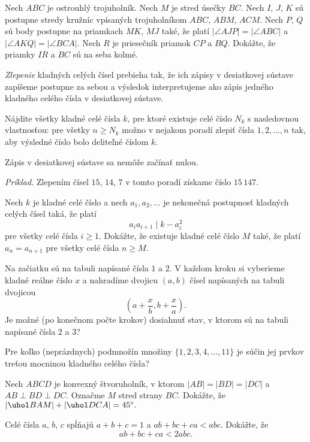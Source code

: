 {%
Nech $ABC$ je ostrouhlý trojuholník.
Nech $M$ je stred úsečky $BC$.
Nech $I$, $J$, $K$ sú postupne stredy kružníc vpísaných trojuholníkom $ABC$, $ABM$, $ACM$.
Nech $P$, $Q$ sú body postupne na priamkach $MK$, $MJ$ také, že platí $|\angle AJP| = |\angle ABC|$ a $|\angle AKQ| = |\angle BCA|$.
Nech $R$ je priesečník priamok $CP$ a $BQ$.
Dokážte, že priamky $IR$ a $BC$ sú na seba kolmé.}

{%
{\it Zlepenie} kladných celých čísel prebieha tak, že ich zápisy v desiatkovej sústave zapíšeme postupne za sebou a výsledok interpretujeme ako zápis jedného kladného celého čísla v desiatkovej sústave.

Nájdite všetky kladné celé čísla $k$, pre ktoré existuje celé číslo $N_k$ s nasledovnou vlastnosťou: pre všetky $n \ge N_k$ možno v nejakom poradí zlepiť čísla $1,2,\dots,n$ tak, aby výsledné číslo bolo deliteľné číslom $k$.

\poznamka
Zápis v desiatkovej sústave sa nemôže začínať nulou.

{\it Príklad.} Zlepením čísel $15$, $14$, $7$ v tomto poradí získame číslo $15\,147$.
}

{%
Nech $k$ je kladné celé číslo a nech $a_1, a_2, \ldots$ je nekonečná postupnosť kladných celých čísel taká, že platí $$a_ia_{i+1} \mid k-a_i^2$$
pre všetky celé čísla $i\geq 1.$
Dokážte, že existuje kladné celé číslo $M$ také, že platí $a_n=a_{n+1}$ pre všetky celé čísla $n \geq M$.}

{%
Na začiatku sú na tabuli napísané čísla $1$ a $2$. V každom kroku si vyberieme kladné reálne číslo $x$ a nahradíme dvojicu $(a,b)$ čísel napísaných na tabuli dvojicou
$$\left(a+\frac{x}{b},b+\frac{x}{a}\right).$$
Je možné (po konečnom počte krokov) dosiahnuť stav, v ktorom sú na tabuli napísané čísla $2$ a $3$?}

{%
Pre koľko (neprázdnych) podmnožín množiny $\{1,2,3,4,\dots,11\}$ je súčin jej prvkov treťou mocninou kladného celého čísla?}

{%
Nech $ABCD$ je konvexný štvoruholník, v ktorom $|AB|=|BD|=|DC|$ a ${AB\perp BD\perp DC}$. Označme $M$ stred strany $BC$. Dokážte, že
$|\uhol BAM|+|\uhol DCA|=45^\circ.$}

{%
Celé čísla $a$, $b$, $c$ spĺňajú $a + b + c = 1$ a $ab + bc + ca < abc$. Dokážte, že
$$ab + bc + ca < 2abc.$$}

